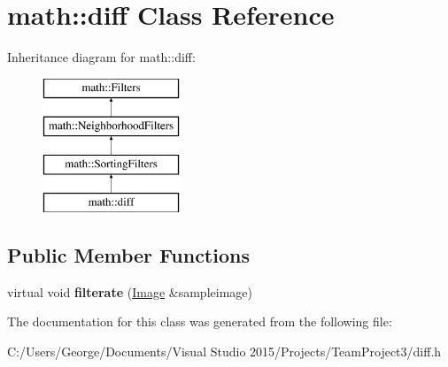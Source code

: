 \hypertarget{classmath_1_1diff}{}\section{math\+:\+:diff Class Reference}
\label{classmath_1_1diff}
Inheritance diagram for math\+:\+:diff\+:\begin{figure}[H]
\begin{center}
\leavevmode
\includegraphics[height=4.000000cm]{classmath_1_1diff}
\end{center}
\end{figure}
\subsection*{Public Member Functions}
\begin{DoxyCompactItemize}
\item 
\mbox{\label{classmath_1_1diff_a406b8ce6b7d687d05c3e2f3b639ae854}} 
virtual void {\bfseries filterate} (\hyperlink{classmath_1_1_image}{Image} \&sampleimage)
\end{DoxyCompactItemize}


The documentation for this class was generated from the following file\+:\begin{DoxyCompactItemize}
\item 
C\+:/\+Users/\+George/\+Documents/\+Visual Studio 2015/\+Projects/\+Team\+Project3/diff.\+h\end{DoxyCompactItemize}
